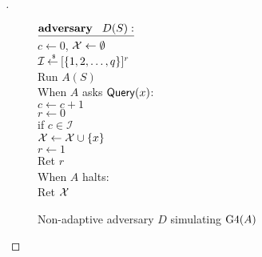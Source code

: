 \begin{proof}[]

\begin{figure}
\centering
{}
{
${\underline{\textbf{adversary}\hspace*{2ex} {D(S)}:}}$\\[4pt]
$c \gets 0$, ${\cal X} \gets \emptyset$\\
$\mathcal{I}{\:\stackrel{{\scriptscriptstyle \hspace{0.2em}\$}} {\leftarrow}\:} [\{1,2,\ldots,q\}]^r$\\
Run $A(S)$\\
When $A$ asks $\mathsf{Query}(x)$:\\
\nudge $c \gets c+1$\\
\nudge $r \gets 0$\\
\nudge if $c \in \mathcal{I}$\\
\nudge \nudge ${\cal X} \gets {\cal X} \cup \{x\}$\\
\nudge \nudge $r \gets 1$\\
\nudge Ret $r$\\
When $A$ halts:\\
\nudge Ret ${\cal X}$
}
\caption{Non-adaptive adversary $D$ simulating $\text{G4}(A)$} \label{fig:D}
\end{figure}	



\end{proof}
